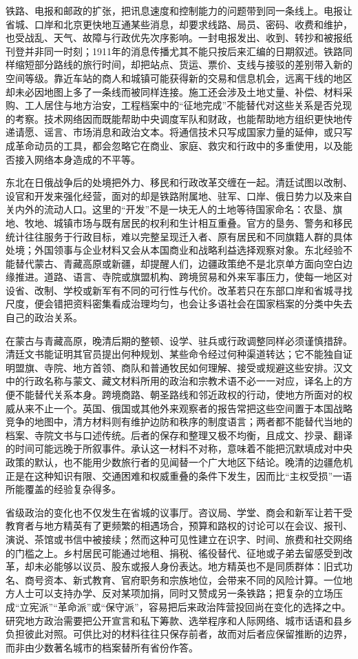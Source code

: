 铁路、电报和邮政的扩张，把讯息速度和控制能力的问题带到同一条线上。电报让省城、口岸和北京更快地互通某些消息，却要求线路、局员、密码、收费和维护，也受战乱、天气、故障与行政优先次序影响。一封电报发出、收到、转抄和被报纸刊登并非同一时刻；1911年的消息传播尤其不能只按后来汇编的日期叙述。铁路同样缩短部分路线的旅行时间，却把站点、货运、票价、支线与接驳的差别带入新的空间等级。靠近车站的商人和城镇可能获得新的交易和信息机会，远离干线的地区却未必因地图上多了一条线而被同样连接。施工还会涉及土地丈量、补偿、材料采购、工人居住与地方治安，工程档案中的“征地完成”不能替代对这些关系是否兑现的考察。技术网络因而既能帮助中央调度军队和财政，也能帮助地方组织更快地传递请愿、谣言、市场消息和政治文本。将通信技术只写成国家力量的延伸，或只写成革命动员的工具，都会忽略它在商业、家庭、救灾和行政中的多重使用，以及能否接入网络本身造成的不平等。

东北在日俄战争后的处境把外力、移民和行政改革交缠在一起。清廷试图以改制、设官和开发来强化经营，面对的却是铁路附属地、驻军、口岸、俄日势力以及来自关内外的流动人口。这里的“开发”不是一块无人的土地等待国家命名：农垦、旗地、牧地、城镇市场与既有居民的权利和生计相互重叠。官方的垦务、警务和移民统计往往服务于行政目标，难以完整呈现迁入者、原有居民和不同旗籍人群的具体处境；外国领事与企业材料又会从本国商业和战略利益选择观察对象。东北经验不能替代蒙古、青藏高原或新疆，却提醒人们，边疆政策绝不是北京单方面向空白边缘推进。道路、语言、寺院或旗盟机构、跨境贸易和外来军事压力，使每一地区对设省、改制、学校或新军有不同的可行性与代价。改革若只在东部口岸和省城寻找尺度，便会错把资料密集看成治理均匀，也会让多语社会在国家档案的分类中失去自己的政治关系。

在蒙古与青藏高原，晚清后期的整顿、设学、驻兵或行政调整同样必须谨慎措辞。清廷文书能证明其官员提出何种规划、某些命令经过何种渠道转达；它不能独自证明盟旗、寺院、地方首领、商队和普通牧民如何理解、接受或规避这些安排。汉文中的行政名称与蒙文、藏文材料所用的政治和宗教术语不必一一对应，译名上的方便不能替代关系本身。跨境商路、朝圣路线和邻近政权的行动，使地方所面对的权威从来不止一个。英国、俄国或其他外来观察者的报告常把这些空间置于本国战略竞争的地图中，清方材料则有维护边防和秩序的制度语言；两者都不能替代当地的档案、寺院文书与口述传统。后者的保存和整理又极不均衡，且成文、抄录、翻译的时间可能远晚于所叙事件。承认这一材料不对称，意味着不能把沉默填成对中央政策的默认，也不能用少数旅行者的见闻替一个广大地区下结论。晚清的边疆危机正是在这种知识有限、交通困难和权威重叠的条件下发生，因而比“主权受损”一语所能覆盖的经验复杂得多。

省级政治的变化也不仅发生在省城的议事厅。咨议局、学堂、商会和新军让若干受教育者与地方精英有了更频繁的相遇场合，预算和路权的讨论可以在会议、报刊、演说、茶馆或书信中被接续；然而这种可见性建立在识字、时间、旅费和社交网络的门槛之上。乡村居民可能通过地租、捐税、徭役替代、征地或子弟去留感受到改革，却未必能够以议员、股东或报人身份表达。地方精英也不是同质群体：旧式功名、商号资本、新式教育、官府职务和宗族地位，会带来不同的风险计算。一位地方人士可以支持办学、反对某项加捐，同时又赞成另一条铁路；把复杂的立场压成“立宪派”“革命派”或“保守派”，容易把后来政治阵营投回尚在变化的选择之中。研究地方政治需要把公开宣言和私下筹款、选举程序和人际网络、城市话语和县乡负担彼此对照。可供比对的材料往往只保存前者，故而对后者应保留推断的边界，而非由少数著名城市的档案替所有省份作答。

